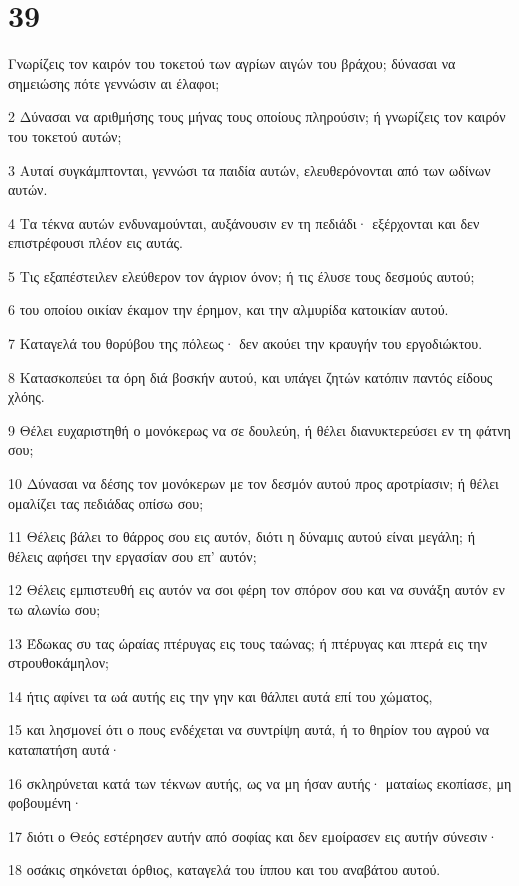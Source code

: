 \chapter{39}

\par Γνωρίζεις τον καιρόν του τοκετού των αγρίων αιγών του βράχου; δύνασαι να σημειώσης πότε γεννώσιν αι έλαφοι;
\par 2 Δύνασαι να αριθμήσης τους μήνας τους οποίους πληρούσιν; ή γνωρίζεις τον καιρόν του τοκετού αυτών;
\par 3 Αυταί συγκάμπτονται, γεννώσι τα παιδία αυτών, ελευθερόνονται από των ωδίνων αυτών.
\par 4 Τα τέκνα αυτών ενδυναμούνται, αυξάνουσιν εν τη πεδιάδι· εξέρχονται και δεν επιστρέφουσι πλέον εις αυτάς.
\par 5 Τις εξαπέστειλεν ελεύθερον τον άγριον όνον; ή τις έλυσε τους δεσμούς αυτού;
\par 6 του οποίου οικίαν έκαμον την έρημον, και την αλμυρίδα κατοικίαν αυτού.
\par 7 Καταγελά του θορύβου της πόλεως· δεν ακούει την κραυγήν του εργοδιώκτου.
\par 8 Κατασκοπεύει τα όρη διά βοσκήν αυτού, και υπάγει ζητών κατόπιν παντός είδους χλόης.
\par 9 Θέλει ευχαριστηθή ο μονόκερως να σε δουλεύη, ή θέλει διανυκτερεύσει εν τη φάτνη σου;
\par 10 Δύνασαι να δέσης τον μονόκερων με τον δεσμόν αυτού προς αροτρίασιν; ή θέλει ομαλίζει τας πεδιάδας οπίσω σου;
\par 11 Θέλεις βάλει το θάρρος σου εις αυτόν, διότι η δύναμις αυτού είναι μεγάλη; ή θέλεις αφήσει την εργασίαν σου επ' αυτόν;
\par 12 Θέλεις εμπιστευθή εις αυτόν να σοι φέρη τον σπόρον σου και να συνάξη αυτόν εν τω αλωνίω σου;
\par 13 Έδωκας συ τας ώραίας πτέρυγας εις τους ταώνας; ή πτέρυγας και πτερά εις την στρουθοκάμηλον;
\par 14 ήτις αφίνει τα ωά αυτής εις την γην και θάλπει αυτά επί του χώματος,
\par 15 και λησμονεί ότι ο πους ενδέχεται να συντρίψη αυτά, ή το θηρίον του αγρού να καταπατήση αυτά·
\par 16 σκληρύνεται κατά των τέκνων αυτής, ως να μη ήσαν αυτής· ματαίως εκοπίασε, μη φοβουμένη·
\par 17 διότι ο Θεός εστέρησεν αυτήν από σοφίας και δεν εμοίρασεν εις αυτήν σύνεσιν·
\par 18 οσάκις σηκόνεται όρθιος, καταγελά του ίππου και του αναβάτου αυτού.
